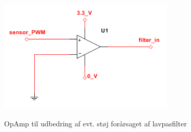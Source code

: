 \begin{figure}[htb]
\centering
{\includegraphics[width=0.75\textwidth]{filer/design/Billeder/sht_opamp.png}}
\caption{OpAmp til udbedring af evt. støj forårsaget af lavpasfilter}
\label{lab:sht_opamp}
\end{figure}
